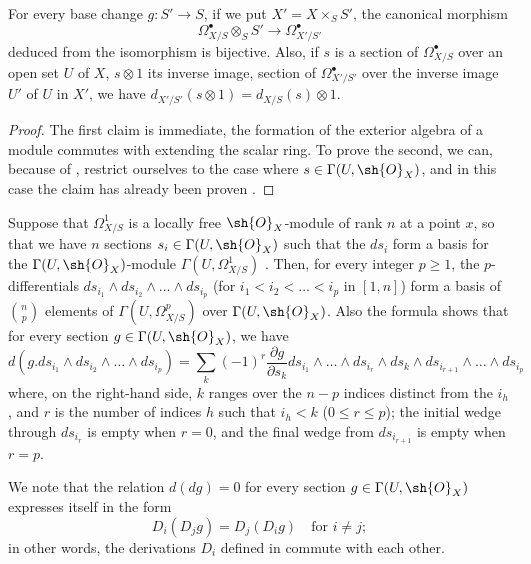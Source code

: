 \begin{proposition}[16.6.4]
\label{IV.16.6.4}
For every base change $g:S' \to S$, if we put $X' = X \times_S S'$, the canonical morphism
\[
  \label{IV.16.6.4.1}
  \Omega_{X/S}^\bullet \otimes_S S' \to \Omega_{X'/S'}^\bullet
  \tag{16.6.4.1}
\]
deduced from the isomorphism  is bijective.
Also, if $s$ is a section of $\Omega_{X/S}^\bullet$ over an open set $U$ of $X$, $s \otimes 1$ its inverse image, section of $\Omega_{X'/S'}^\bullet$ over the inverse image $U'$ of $U$ in $X'$, we have $d_{X'/S'}(s \otimes 1) = d_{X/S}(s) \otimes 1$.
\end{proposition}

\begin{proof}
The first claim is immediate, the formation of the exterior algebra of a module commutes with extending the scalar ring.
To prove the second, we can, because of , restrict ourselves to the case where $s \in \Gamma(U, \sh{O}_X)$, and in this case the claim has already been proven .
\end{proof}

\begin{env}[16.6.5]
\label{IV.16.6.5}
Suppose that $\Omega_{X/S}^1$ is a locally free $\sh{O}_X$-module of rank $n$ at a point $x$, so that we have $n$ sections $s_i \in \Gamma(U, \sh{O}_X)$ such that the $ds_i$ form a basis for the $\Gamma(U, \sh{O}_X)$-module $\Gamma(U, \Omega_{X/S}^1)$ .
Then, for every integer $p \geq 1$, the $p$-differentials $ds_{i_1} \wedge ds_{i_2} \wedge \dots \wedge ds_{i_p}$ (for $i_1 < i_2 < \dots < i_p$ in $[1,n]$) form a basis of $\binom{n}{p}$ elements of $\Gamma(U, \Omega_{X/S}^p)$ over $\Gamma(U, \sh{O}_X)$.
Also the formula  shows that for every section $g \in \Gamma(U, \sh{O}_X)$, we have
\[
  \label{IV.16.6.5.1}
  d(g.ds_{i_1} \wedge ds_{i_2} \wedge \dots \wedge ds_{i_p}) = \sum_k (-1)^r \frac{\partial g}{\partial s_k} ds_{i_1} \wedge \dots \wedge ds_{i_r} \wedge ds_k \wedge ds_{i_{r+1}} \wedge \dots \wedge ds_{i_p}
  \tag{16.6.5.1}
\]
where, on the right-hand side, $k$ ranges over the $n-p$ indices distinct from the $i_h$, and $r$ is the number of indices $h$ such that $i_h<k$ ($0\leq r\leq p$); the initial wedge through $ds_{i_r}$ is empty when $r=0$, and the final wedge from $ds_{i_{r+1}}$ is empty when $r=p$.

We note that the relation $d(dg) = 0$ for every section $g \in \Gamma(U, \sh{O}_X)$ expresses itself in the form
\[
  D_i(D_j g) = D_j(D_i g) \quad \text{for $i \neq j$};
\]
in other words, the derivations $D_i$ defined in  commute with each other.
\end{env}

